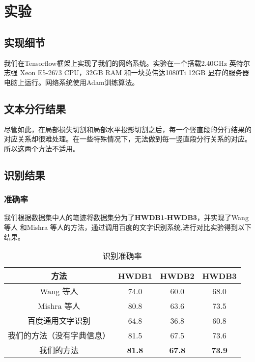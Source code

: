 \documentclass[winfonts, thesis]{njuthesis}
\begin{document}
\chapter{实验}

\section{实现细节}
我们在Tensorflow框架上实现了我们的网络系统。实验在一个搭载2.40GHz 英特尔志强 Xeon E5-2673 CPU，32GB RAM 和一块英伟达1080Ti 12GB 显存的服务器电脑上运行。网络系统使用Adam训练算法。



\section{文本分行结果}
尽管如此，在局部损失切割和局部水平投影切割之后，每一个竖直段的分行结果的对应关系却很难处理。在一些特殊情况下，无法做到每一竖直段分行关系的对应。所以这两个方法不适用。




\section{识别结果}

\subsection{准确率}
我们根据数据集中人的笔迹将数据集分为了\textbf{HWDB1}-\textbf{HWDB3}，并实现了Wang 等人\cite{wang2012end} 和Mishra 等人\cite{mishra2012scene}的方法，通过调用百度的文字识别系统\cite{baiduapi},进行对比实验得到以下结果。

\vspace{0.2cm}
\begin{table}[htbp]
  \setlength{\belowcaptionskip}{5pt}
  \centering
  \begin{tabular}{cccc}
    \toprule
    \textbf{方法}                     & \textbf{HWDB1} & \textbf{HWDB2} & \textbf{HWDB3} \\
    \midrule
    Wang 等人\cite{wang2012end}       & 74.0           & 60.0           & 68.0           \\
    Mishra 等人\cite{mishra2012scene} & 80.8           & 63.6           & 73.5           \\
    百度通用文字识别\cite{baiduapi}   & 64.8           & 36.8           & 60.8           \\
    \midrule
    我们的方法（没有字典信息）        & 81.5           & 67.5           & 73.6           \\
    我们的方法                        & \textbf{81.8}  & \textbf{67.8}  & \textbf{73.9}  \\
    \bottomrule
  \end{tabular}
  \vspace{0.2cm}
  \caption{识别准确率}\label{table:result}
\end{table}
\end{document}
